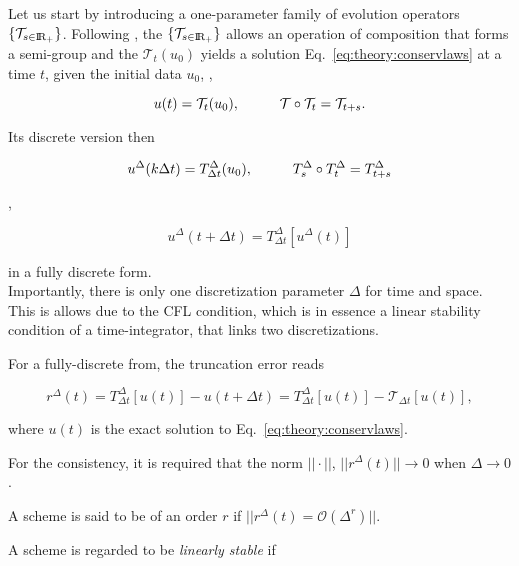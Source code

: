 Let us start by introducing a one-parameter family of evolution operators $\{\mathcal{T}_{s\in\text{I\!R}_+}\}$. Following \citet{Kruzkov:1970}, the $\{\mathcal{T}_{s\in\text{I\!R}_+}\}$ allows an operation of composition that forms a semi-group and the $\mathcal{T}_t(u_0)$ yields a solution Eq.~\eqref{eq:theory:conservlaws} at a time $t$, given the initial data $u_0$, \ie, 

\begin{equation}
u(t) = \mathcal{T}_t(u_0), \hspace{10mm} \mathcal{T}\circ\mathcal{T}_t = \mathcal{T}_{t+s}.
\end{equation}

Its discrete version then

\begin{equation}
u^{\Delta}(k\Delta t) = T^{\Delta}_{\Delta t}(u_0), \hspace{10mm} T^{\Delta}_s\circ T^{\Delta}_t = T^{\Delta} _{t+s}
\end{equation}

\ie,

\begin{equation}
u^{\Delta}(t+\Delta t) = T^{\Delta} _{\Delta t}[u^{\Delta}(t)]
\end{equation}

in a fully discrete form. \\

Importantly, there is only one discretization parameter $\Delta$ for time and space. This is allows due to the  \ac{CFL} condition, which is in essence a linear stability condition of a time-integrator, that links two discretizations. 

For a fully-discrete from, the truncation error reads 

\begin{equation}
r^{\Delta}(t) = T^{\Delta}_{\Delta t}[u(t)] - u(t + \Delta t) = T^{\Delta}_{\Delta t}[u(t)] - \mathcal{T}_{\Delta t}[u(t)],
\end{equation}

where $u(t)$ is the exact solution to Eq.~\eqref{eq:theory:conservlaws}. 

For the consistency, it is required that the norm $||\cdot||$, $||r^{\Delta}(t)||\rightarrow 0$ when $\Delta\rightarrow 0$. 

A scheme is said to be of an order $r$ if $||r^{\Delta}(t) = \mathcal{O}(\Delta^r)||$. 

A scheme is regarded to be \textit{linearly stable} if 

